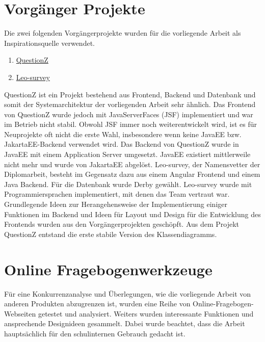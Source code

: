 \section{Vorgänger Projekte}
Die zwei folgenden Vorgängerprojekte wurden für die vorliegende Arbeit als Inspirationsquelle verwendet.
\begin{enumerate}
    \item \href{https://github.com/htl-leonding-project/questionz}{QuestionZ} \cite{noauthor_fragebogen_nodate}
    \item \href{https://github.com/htl-leonding-project/leo-survey}{Leo-survey} \cite{noauthor_fragebogen_nodate-1}
\end{enumerate}
QuestionZ ist ein Projekt bestehend aus Frontend, Backend und Datenbank und 
somit der Systemarchitektur der vorliegenden Arbeit sehr ähnlich.
Das Frontend von QuestionZ wurde jedoch mit JavaServerFaces (JSF) implementiert und war im Betrieb nicht stabil. 
Obwohl JSF immer noch weiterentwickelt wird, ist es für Neuprojekte oft nicht die erste Wahl, insbesondere wenn keine 
JavaEE bzw. JakartaEE-Backend verwendet wird. Das Backend von QuestionZ wurde in JavaEE mit einem Application
Server umgesetzt. JavaEE existiert mittlerweile nicht mehr und wurde von JakartaEE abgelöst. \cite{noauthor_fragebogen_nodate}
\newline
Leo-survey, der Namensvetter der Diplomarbeit, besteht im Gegensatz dazu aus einem Angular Frontend und einem Java 
Backend. Für die Datenbank wurde Derby gewählt. \cite{noauthor_fragebogen_nodate-1}
\newline
\newline
Leo-survey wurde mit Programmiersprachen implementiert, mit denen das Team vertraut war. Grundlegende Ideen zur 
Herangehensweise der Implementierung einiger Funktionen im Backend und Ideen für Layout und Design für die Entwicklung des 
Frontends wurden aus den Vorgängerprojekten geschöpft.
Aus dem Projekt QuestionZ entstand die erste stabile Version des Klassendiagramms. 

\section{Online Fragebogenwerkzeuge}
Für eine Konkurrenzanalyse und Überlegungen, wie die vorliegende Arbeit von anderen 
Produkten abzugrenzen ist, wurden eine Reihe von Online-Fragebogen-Webseiten getestet und analysiert.
Weiters wurden interessante Funktionen und ansprechende Designideen gesammelt. Dabei wurde beachtet, dass  
die Arbeit hauptsächlich für den schulinternen Gebrauch gedacht ist. 

